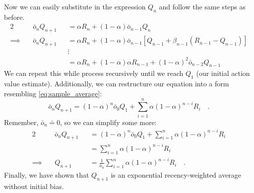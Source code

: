 \documentclass[12pt]{article}
\begin{document}
Now we can easily substitute in the expression $Q_n$ and follow the same steps as before.
\begin{alignat*}{2}
    & \bar{o}_n Q_{n + 1} && = \alpha R_n + \left(1 - \alpha \right) \bar{o}_{n - 1} Q_n \\
    \implies\quad & \bar{o}_n Q_{n + 1} && = \alpha R_n + \left(1 - \alpha \right) \bar{o}_{n - 1} \left[Q_{n - 1} + \beta_{n - 1}\left(R_{n - 1} - Q_{n - 1}\right)\right] \\
    & && \vdots \\
    & && = \alpha R_n + \left(1 - \alpha\right) \alpha R_{n - 1} + \left(1 - \alpha\right)^2\bar{o}_{n - 2}Q_{n - 1}
\end{alignat*}
We can repeat this while process recursively until we reach $Q_1$ (our initial action value estimate).
Additionally, we can restructure our equation into a form resembling \eqref{eq:sample_average}:
\begin{equation*}
    \bar{o}_n Q_{n + 1} = \left(1 - \alpha\right)^n\bar{o}_0Q_1 + \sum^n_{i = 1}\alpha \left(1 - \alpha\right)^{n - i}R_i
    \quad\text{.}
\end{equation*}
Remember, $\bar{o}_n \doteq 0$, so we can simplify some more:
\begin{alignat*}{2}
    & \bar{o}_n Q_{n + 1} && = \left(1 - \alpha\right)^n\bar{o}_0Q_1 + \sum^n_{i = 1}\alpha \left(1 - \alpha\right)^{n - i}R_i \\
    & && = \sum^n_{i = 1}\alpha \left(1 - \alpha\right)^{n - i}R_i \\
    \implies\quad & Q_{n + 1} && = \frac{1}{\bar{o}_n} \sum^n_{i = 1}\alpha \left(1 - \alpha\right)^{n - i}R_i
    \quad\text{.}
\end{alignat*}
Finally, we have shown that $Q_{n + 1}$ is an exponential recency-weighted average without initial bias.
\end{document}
